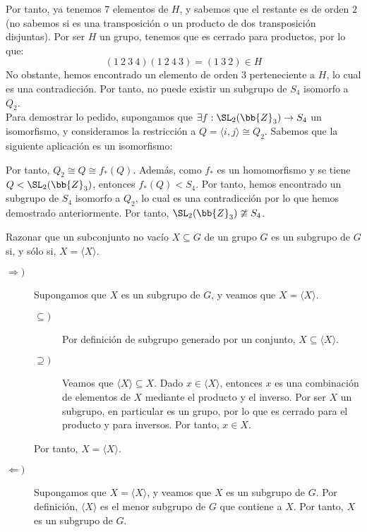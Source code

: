 \begin{ejercicio}
\begin{enumerate}
        Por tanto, ya tenemos $7$ elementos de $H$, y sabemos que el restante es de orden $2$ (no sabemos si es una transposición o un producto de dos transposición disjuntas). Por ser $H$ un grupo, tenemos que es cerrado para productos, por lo que:
        \begin{equation*}
            (1\ 2\ 3\ 4)(1\ 2\ 4\ 3)=(1\ 3\ 2)\in H
        \end{equation*}
        No obstante, hemos encontrado un elemento de orden $3$ perteneciente a $H$, lo cual es una contradicción. Por tanto, no puede existir un subgrupo de $S_4$ isomorfo a $Q_2$.\\

        Para demostrar lo pedido, supongamos que $\exists f:\SL_2(\bb{Z}_3)\to S_4$ un isomorfismo, y consideramos la restricción a $Q=\langle i,j\rangle\cong Q_2$. Sabemos que la siguiente aplicación es un isomorfismo:

        Por tanto, $Q_2\cong Q\cong f_{\ast}(Q)$. Además, como $f_\ast$ es un homomorfismo y se tiene $Q< \SL_2(\bb{Z}_3)$, entonces $f_{\ast}(Q)< S_4$. Por tanto, hemos encontrado un subgrupo de $S_4$ isomorfo a $Q_2$, lo cual es una contradicción por lo que hemos demostrado anteriormente. Por tanto, $\SL_2(\bb{Z}_3)\ncong S_4$.
    \end{enumerate}
\end{ejercicio}

\begin{ejercicio}\label{ej:3.4}
    Razonar que un subconjunto no vacío $X \subseteq G$ de un grupo $G$ es un subgrupo de $G$ si, y sólo si, $X = \langle X \rangle$.
    \begin{description}
        \item[$\Longrightarrow)$] Supongamos que $X$ es un subgrupo de $G$, y veamos que $X = \langle X \rangle$. \begin{description}
            \item[$\subseteq)$] Por definición de subgrupo generado por un conjunto, $X\subseteq\langle X\rangle$.
            \item[$\supseteq)$] Veamos que $\langle X\rangle\subseteq X$. Dado $x\in \langle X\rangle$, entonces $x$ es una combinación de elementos de $X$ mediante el producto y el inverso. Por ser $X$ un subgrupo, en particular es un grupo, por lo que es cerrado para el producto y para inversos. Por tanto, $x\in X$.
        \end{description}

        Por tanto, $X = \langle X\rangle$.
        \item[$\Longleftarrow)$] Supongamos que $X = \langle X\rangle$, y veamos que $X$ es un subgrupo de $G$. Por definición, $\langle X\rangle$ es el menor subgrupo de $G$ que contiene a $X$. Por tanto, $X$ es un subgrupo de $G$.
    \end{description}
\end{ejercicio}

